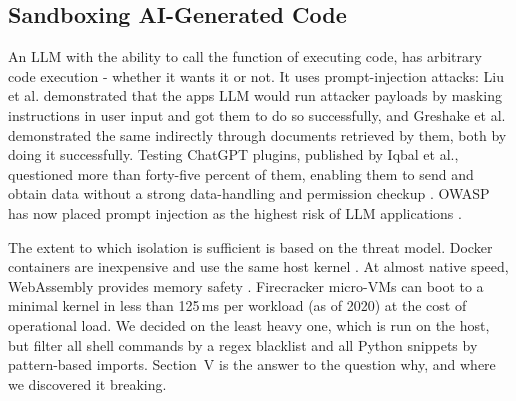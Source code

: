\documentclass[conference]{IEEEtran}
\begin{document}
\subsection{Sandboxing AI-Generated Code}
An LLM with the ability to call the function of executing code, has arbitrary code execution - whether it wants it or not. It uses prompt-injection attacks: Liu et al. demonstrated that the apps LLM would run attacker payloads by masking instructions in user input and got them to do so successfully, and Greshake et al. demonstrated the same indirectly through documents retrieved by them, both by doing it successfully. Testing ChatGPT plugins, published by Iqbal et al., questioned more than forty-five percent of them, enabling them to send and obtain data without a strong data-handling and permission checkup \cite{iqbal2024llmplatform}. OWASP has now placed prompt injection as the highest risk of LLM applications \cite{owasp2025llm}.

The extent to which isolation is sufficient is based on the threat model. Docker containers are inexpensive and use the same host kernel \cite{sultan2019container}. At almost native speed, WebAssembly provides memory safety \cite{haas2017webassembly, perrone2024wasm}. Firecracker micro-VMs can boot to a minimal kernel in less than 125\,ms per workload (as of 2020) \cite{agache2020firecracker} at the cost of operational load. We decided on the least heavy one, which is run on the host, but filter all shell commands by a regex blacklist and all Python snippets by pattern-based imports. Section~V is the answer to the question why, and where we discovered it breaking.
\end{document}
